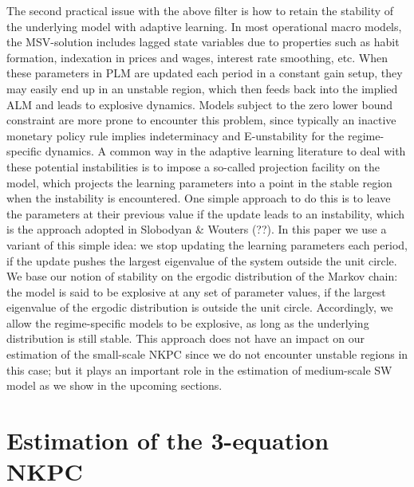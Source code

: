 \documentclass[12pt,reqno]{article}
\numberwithin{equation}{section}
\begin{document}
The second practical issue with the above filter is how to retain the stability of the underlying model with adaptive learning. In most operational macro models, the MSV-solution includes lagged state variables due to properties such as habit formation, indexation in prices and wages, interest rate smoothing, etc. When these parameters in PLM are updated each period in a constant gain setup, they may easily end up in an unstable region, which then feeds back into the implied ALM and leads to explosive dynamics. Models subject to the zero lower bound constraint are more prone to encounter this problem, since typically an inactive monetary policy  rule implies indeterminacy and E-unstability for the regime-specific dynamics. A common way in the adaptive learning literature to deal with these potential instabilities is to impose a so-called projection facility on the model, which projects the learning parameters into a point in the stable region when the instability is encountered. One simple approach to do this is to leave the parameters at their previous value if the update leads to an instability, which is the approach adopted in Slobodyan \& Wouters (??). In this paper we use a variant of this simple idea: we stop updating the learning parameters each period, if the update pushes the largest eigenvalue of the system outside the unit circle. We base our notion of stability on the ergodic distribution of the Markov chain: the model is said to be explosive at any set of parameter values, if the largest eigenvalue of the ergodic distribution is outside the unit circle. Accordingly, we allow the regime-specific models to be explosive, as long as the underlying distribution is still stable. This approach does not have an impact on our estimation of the small-scale NKPC since we do not encounter unstable regions in this case; but it plays an important role in the estimation of medium-scale SW model as we show in the upcoming sections. 








\section{Estimation of the 3-equation NKPC} 
\end{document}
